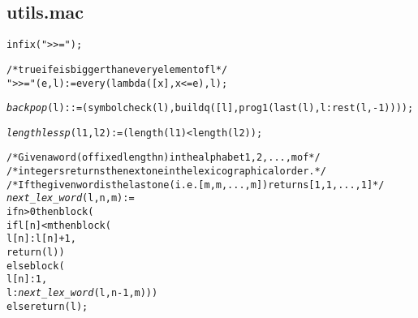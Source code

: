 \subsection*{utils.mac}
\begin{alltt}
\footnotesize
infix (">>=");

/* true if e is bigger than every element of l */
">>=" (e,l) := every (lambda ([x], x <= e), l);

\emph{backpop}(l)::=(symbolcheck(l),buildq([l],prog1(last(l),l:rest(l, -1))));

\emph{lengthlessp} (l1, l2) := (length (l1) < length (l2));

/* Given a word (of fixed length n) in the alphabet {1,2,...,m} of */
/* integers returns the next one in the lexicographical order. */
/* If the given word is the last one (i.e. [m,m,...,m]) returns [1,1,...,1] */
\emph{next\_lex\_word} (l, n, m) :=
if n > 0 then block (
  if l[n] < m then block (
    l[n] : l[n]+1,
    return (l))
  else block (
    l[n] : 1,
    l : \emph{next\_lex\_word} (l, n-1, m)))
else return (l);
\end{alltt}
\small

